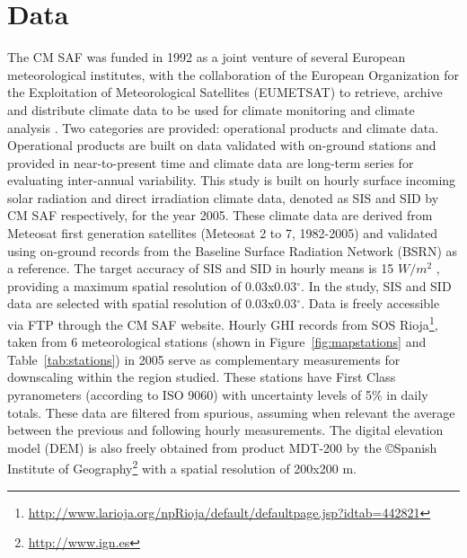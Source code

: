 \documentclass[11pt, english]{article}
\let\cite\citep
\begin{document}
\section{Data}

The CM SAF was funded in 1992 as a joint venture of several European
meteorological institutes, with the collaboration of the European
Organization for the Exploitation of Meteorological Satellites
(EUMETSAT) to retrieve, archive and distribute climate data to be used
for climate monitoring and climate analysis
\cite{Posselt.Mueller.ea2012a}. Two categories are provided:
operational products and climate data. Operational products are built
on data validated with on-ground stations and provided in
near-to-present time and climate data are long-term series for
evaluating inter-annual variability. This study is built on hourly
surface incoming solar radiation and direct irradiation climate data,
denoted as SIS and SID by CM SAF respectively, for the year
2005. These climate data are derived from Meteosat first generation
satellites (Meteosat 2 to 7, 1982-2005) and validated using on-ground
records from the Baseline Surface Radiation Network (BSRN) as a
reference. The target accuracy of SIS and SID in hourly means is 15
$W/m^{2}$ \cite{Posselt.Muller.ea2011}, providing a maximum spatial
resolution of 0.03x0.03$^\circ$. In the study, SIS and SID data are
selected with spatial resolution of 0.03x0.03$^\circ$. Data is freely
accessible via FTP through the CM SAF website.  Hourly GHI records
from SOS
Rioja\footnote{\url{http://www.larioja.org/npRioja/default/defaultpage.jsp?idtab=442821}},
taken from 6 meteorological stations (shown in
Figure~\ref{fig:mapstations} and Table~\ref{tab:stations}) in 2005
serve as complementary measurements for downscaling within the region
studied.  These stations have First Class pyranometers (according to
ISO 9060) with uncertainty levels of 5\% in daily totals. These data
are filtered from spurious, assuming when relevant the average between
the previous and following hourly measurements.  The digital elevation
model (DEM) is also freely obtained from product MDT-200 by the
\copyright Spanish Institute of
Geography\footnote{\url{http://www.ign.es}} with a spatial resolution
of 200x200 m.
\end{document}
